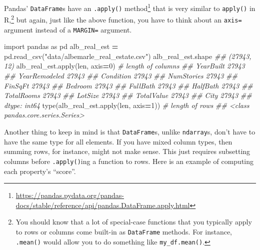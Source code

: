 \documentclass[
  12pt,
  krantz2]{krantz}
\makeatletter
\newenvironment{Shaded}{\begin{snugshade}}{\end{snugshade}}
\newcommand{\BuiltInTok}[1]{#1}
\newcommand{\CommentTok}[1]{\textcolor[rgb]{0.37,0.37,0.37}{\textit{#1}}}
\newcommand{\DecValTok}[1]{\textcolor[rgb]{0.06,0.06,0.06}{#1}}
\newcommand{\ImportTok}[1]{#1}
\newcommand{\NormalTok}[1]{#1}
\newcommand{\OperatorTok}[1]{\textcolor[rgb]{0.43,0.43,0.43}{\textbf{#1}}}
\newcommand{\StringTok}[1]{\textcolor[rgb]{0.5,0.5,0.5}{#1}}
\renewcommand{\href}[2]{#2\footnote{\url{#1}}}
\newenvironment{kframe}{%
\medskip{}
\setlength{\fboxsep}{.8em}
 \def\at@end@of@kframe{}%
 \ifinner\ifhmode%
  \def\at@end@of@kframe{\end{minipage}}%
  \begin{minipage}{\columnwidth}%
 \fi\fi%
 \def\FrameCommand##1{\hskip\@totalleftmargin \hskip-\fboxsep
 \colorbox{shadecolor}{##1}\hskip-\fboxsep
     \hskip-\linewidth \hskip-\@totalleftmargin \hskip\columnwidth}%
 \MakeFramed {\advance\hsize-\width
   \@totalleftmargin\z@ \linewidth\hsize
   \@setminipage}}%
 {\par\unskip\endMakeFramed%
 \at@end@of@kframe}
\renewenvironment{Shaded}{\begin{kframe}}{\end{kframe}}
\makeatother
\begin{document}
Pandas' \texttt{DataFrame}s have an \href{https://pandas.pydata.org/pandas-docs/stable/reference/api/pandas.DataFrame.apply.html}{\texttt{.apply()} method} that is very similar to \texttt{apply()} in R,\footnote{You should know that a lot of special-case functions that you typically apply to rows or columns come built-in as \texttt{DataFrame} methods. For instance, \texttt{.mean()} would allow you to do something like \texttt{my\_df.mean()}.} but again, just like the above function, you have to think about an \texttt{axis=} argument instead of a \texttt{MARGIN=} argument.

\begin{Shaded}
\begin{Highlighting}[]
\ImportTok{import}\NormalTok{ pandas }\ImportTok{as}\NormalTok{ pd}
\NormalTok{alb\_real\_est }\OperatorTok{=}\NormalTok{ pd.read\_csv(}\StringTok{"data/albemarle\_real\_estate.csv"}\NormalTok{)}
\NormalTok{alb\_real\_est.shape}
\CommentTok{\#\# (27943, 12)}
\NormalTok{alb\_real\_est.}\BuiltInTok{apply}\NormalTok{(}\BuiltInTok{len}\NormalTok{, axis}\OperatorTok{=}\DecValTok{0}\NormalTok{) }\CommentTok{\# length of columns}
\CommentTok{\#\# YearBuilt        27943}
\CommentTok{\#\# YearRemodeled    27943}
\CommentTok{\#\# Condition        27943}
\CommentTok{\#\# NumStories       27943}
\CommentTok{\#\# FinSqFt          27943}
\CommentTok{\#\# Bedroom          27943}
\CommentTok{\#\# FullBath         27943}
\CommentTok{\#\# HalfBath         27943}
\CommentTok{\#\# TotalRooms       27943}
\CommentTok{\#\# LotSize          27943}
\CommentTok{\#\# TotalValue       27943}
\CommentTok{\#\# City             27943}
\CommentTok{\#\# dtype: int64}
\BuiltInTok{type}\NormalTok{(alb\_real\_est.}\BuiltInTok{apply}\NormalTok{(}\BuiltInTok{len}\NormalTok{, axis}\OperatorTok{=}\DecValTok{1}\NormalTok{)) }\CommentTok{\# length of rows}
\CommentTok{\#\# \textless{}class \textquotesingle{}pandas.core.series.Series\textquotesingle{}\textgreater{}}
\end{Highlighting}
\end{Shaded}

Another thing to keep in mind is that \texttt{DataFrame}s, unlike \texttt{ndarray}s, don't have to have the same type for all elements. If you have mixed column types, then summing rows, for instance, might not make sense. This just requires subsetting columns before \texttt{.apply()}ing a function to rows. Here is an example of computing each property's ``score''.
\end{document}
